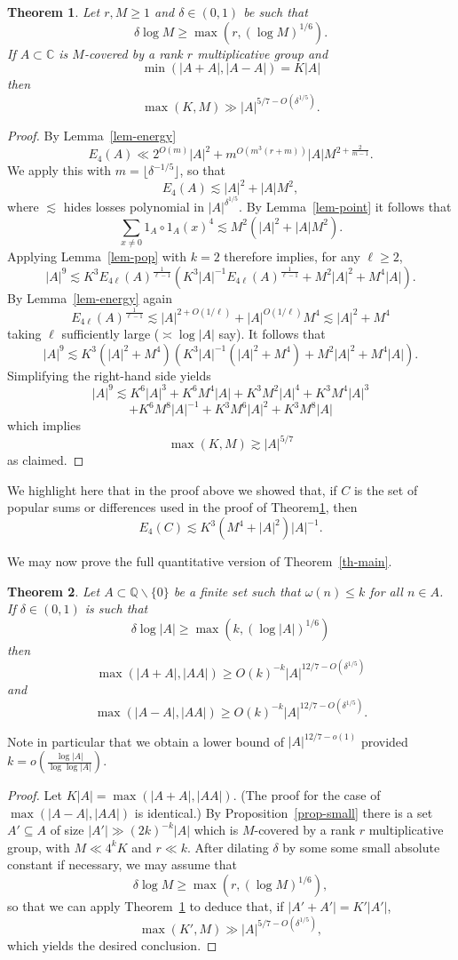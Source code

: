 \documentclass{amsart}
\renewcommand{\leq}{\leqslant}
\renewcommand{\geq}{\geqslant}
\newcommand{\bbq}{\mathbb{Q}}
\newcommand{\bbc}{\mathbb{C}}
\newcommand{\ls}{\lesssim}
\newcommand{\abs}[1]{\left\lvert #1\right\rvert}
\newcommand{\brac}[1]{\left( #1\right)}
\newtheorem{theorem}{Theorem}
\theoremstyle{definition}
\begin{document}
\begin{theorem}\label{th-growth}
Let $r,M\geq 1$ and $\delta\in (0,1)$ be such that
\[\delta \log M \geq \max(r,(\log M)^{1/6}).\]
If $A\subset \bbc$ is $M$-covered by a rank $r$ multiplicative group and 
\[\min(\abs{A+A},\abs{A-A})=K\abs{A}\]
then
\[\max(K,M)\gg \abs{A}^{5/7-O(\delta^{1/5})} .\]
\end{theorem}
\begin{proof}
By Lemma~\ref{lem-energy}
\[E_4(A) \ll 2^{O(m)}\abs{A}^2+m^{O(m^3(r+m))}\abs{A}M^{2+\frac{2}{m-1}}.\] 
We apply this with $m=\lfloor \delta^{-1/5}\rfloor$, so that
\[E_4(A) \lesssim \abs{A}^2+\abs{A}M^2,\]
where $\ls$ hides losses polynomial in $\abs{A}^{\delta^{1/5}}$. By Lemma~\ref{lem-point} it follows that
\[\sum_{x\neq 0} 1_A\circ 1_A(x)^4\lesssim M^2\brac{\abs{A}^2+\abs{A}M^2}.\]
Applying Lemma~\ref{lem-pop} with $k=2$ therefore implies, for any $\ell\geq 2$,
\[\abs{A}^{9}\ls K^{3}E_{4\ell}(A)^{\frac{1}{\ell-1}}\brac{K^3\abs{A}^{-1}E_{4\ell}(A)^{\frac{1}{\ell-1}}+M^2\abs{A}^2+M^4\abs{A}}.\]
By Lemma~\ref{lem-energy} again 
\[E_{4\ell}(A)^{\frac{1}{\ell-1}} \ls \abs{A}^{2+O(1/\ell)}+\abs{A}^{O(1/\ell)}M^{4}\ls \abs{A}^2+M^4\]
taking $\ell$ sufficiently large ($\asymp \log \abs{A}$ say). It follows that 
\[\abs{A}^{9}\ls K^{3}(\abs{A}^2+M^4)\brac{K^3\abs{A}^{-1}(\abs{A}^2+M^4)+M^2\abs{A}^2+M^4\abs{A}}.\]
Simplifying the right-hand side yields
\[\abs{A}^9\ls K^6\abs{A}^3+K^6M^4\abs{A}+K^3M^2\abs{A}^4+K^3M^4\abs{A}^3\]
\[ +K^6M^8\abs{A}^{-1}+K^3M^6\abs{A}^2+K^3M^8\abs{A}\]
which implies
\[\max(K,M) \gtrsim \abs{A}^{5/7}\]
as claimed. 
\end{proof}
We highlight here that in the proof above we showed that, if $C$ is the set of popular sums or differences used in the proof of Theorem\ref{th-growth}, then
\[ E_4(C) \lesssim K^3 (M^4 + \abs{A}^2) \abs{A}^{-1}.\]

We may now prove the full quantitative version of Theorem~\ref{th-main}.

\begin{theorem}\label{th-mainprecise}
Let $A\subset \bbq\backslash \{0\}$ be a finite set such that $\omega(n)\leq k$ for all $n\in A$. If $\delta\in (0,1)$ is such that
\[\delta \log \abs{A} \geq \max(k,(\log \abs{A})^{1/6})\]
then
\[\max(\abs{A+A},\abs{AA})\geq O(k)^{-k}\abs{A}^{12/7-O(\delta^{1/5})}\]
and
\[\max(\abs{A-A},\abs{AA})\geq O(k)^{-k}\abs{A}^{12/7-O(\delta^{1/5})} .\] 
\end{theorem}
Note in particular that we obtain a lower bound of $\abs{A}^{12/7-o(1)}$ provided $k=o(\frac{\log \abs{A}}{\log\log \abs{A}})$. 
\begin{proof}
Let $K\abs{A}=\max(\abs{A+A},\abs{AA})$. (The proof for the case of $\max(\abs{A-A},\abs{AA})$ is identical.) By Proposition~\ref{prop-small} there is a set $A'\subseteq A$ of size $\abs{A'}\gg (2k)^{-k}\abs{A}$ which is $M$-covered by a rank $r$ multiplicative group, with $M\ll 4^kK$ and $r\ll k$. After dilating $\delta$ by some some small absolute constant if necessary, we may assume that
\[\delta \log M \geq \max(r,(\log M)^{1/6}),\]
so that we can apply Theorem~\ref{th-growth} to deduce that, if $\abs{A'+A'}= K'\abs{A'}$, 
\[\max(K',M) \gg \abs{A}^{5/7-O(\delta^{1/5})},\]
which yields the desired conclusion.
\end{proof}
\end{document}

